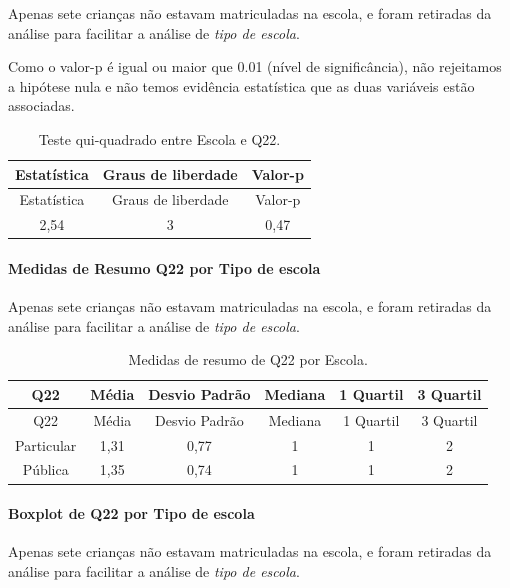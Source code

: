 \documentclass[]{article}
\let\oldparagraph\paragraph
\renewcommand{\paragraph}[1]{\oldparagraph{#1}\mbox{}}
\begin{document}
Apenas sete crianças não estavam matriculadas na escola, e foram retiradas da análise para facilitar a análise de \emph{tipo de escola}.

Como o valor-p é igual ou maior que 0.01 (nível de significância), não rejeitamos a hipótese nula e não temos evidência estatística que as duas variáveis estão associadas.

\begin{longtable}[]{@{}ccc@{}}
\caption{\label{tab:unnamed-chunk-527}Teste qui-quadrado entre Escola e Q22.}\tabularnewline
\toprule
Estatística & Graus de liberdade & Valor-p\tabularnewline
\midrule
\endfirsthead
\toprule
Estatística & Graus de liberdade & Valor-p\tabularnewline
\midrule
\endhead
2,54 & 3 & 0,47\tabularnewline
\bottomrule
\end{longtable}

\cleardoublepage

\hypertarget{medidas-de-resumo-q22-por-tipo-de-escola}{%
\paragraph{Medidas de Resumo Q22 por Tipo de escola}\label{medidas-de-resumo-q22-por-tipo-de-escola}}

Apenas sete crianças não estavam matriculadas na escola, e foram retiradas da análise para facilitar a análise de \emph{tipo de escola}.

\begin{longtable}[]{@{}cccccc@{}}
\caption{\label{tab:unnamed-chunk-528}Medidas de resumo de Q22 por Escola.}\tabularnewline
\toprule
Q22 & Média & Desvio Padrão & Mediana & 1 Quartil & 3 Quartil\tabularnewline
\midrule
\endfirsthead
\toprule
Q22 & Média & Desvio Padrão & Mediana & 1 Quartil & 3 Quartil\tabularnewline
\midrule
\endhead
Particular & 1,31 & 0,77 & 1 & 1 & 2\tabularnewline
Pública & 1,35 & 0,74 & 1 & 1 & 2\tabularnewline
\bottomrule
\end{longtable}

\hypertarget{boxplot-de-q22-por-tipo-de-escola}{%
\paragraph{Boxplot de Q22 por Tipo de escola}\label{boxplot-de-q22-por-tipo-de-escola}}

Apenas sete crianças não estavam matriculadas na escola, e foram retiradas da análise para facilitar a análise de \emph{tipo de escola}.
\end{document}
